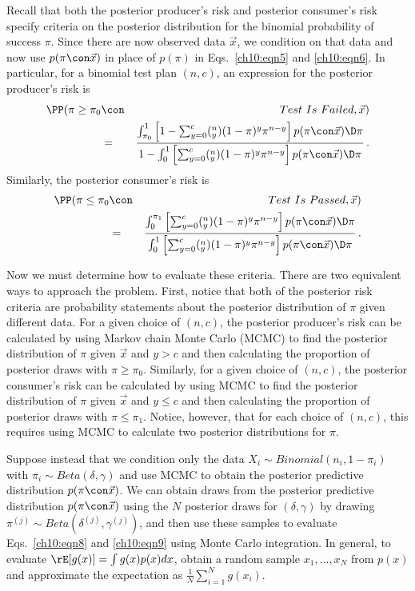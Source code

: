 \documentclass {book}
\begin{document}
Recall that both the posterior producer's
risk and posterior
consumer's risk specify
criteria on the posterior distribution for the binomial
probability of success $\pi$. Since there are now observed data
$\vec{x}$, we condition on that data and now use $p(\pi \con
\vec{x})$ in place of $p(\pi)$ in Eqs.~\ref{ch10:eqn5} and
\ref{ch10:eqn6}. In particular, for a binomial test plan $(n,c)$,
an expression for the posterior producer's risk is
\begin{eqnarray}\label{ch10:eqn8}
\PP(\pi \geq \pi_{0} & \con & Test\mbox{ }Is\mbox{ }Failed,\vec{x})\\
& =& \frac{\int_{\pi_0}^{1} \left[
1-\sum^{c}_{y=0}(_y^{n})(1-\pi)^{y}\pi^{n-y} \right] p(\pi \con
\vec{x}) \D \pi}{1-\int_{0}^{1}
\left[\sum^{c}_{y=0}(_y^{n})(1-\pi)^{y}\pi^{n-y} \right] p(\pi
\con \vec{x}) \D \pi}\, .\nonumber
\end{eqnarray}
Similarly, the posterior consumer's risk is
\begin{eqnarray}\label{ch10:eqn9}
\PP(\pi \leq \pi_{0} & \con & Test\mbox{ }Is\mbox{ }Passed,\vec{x})\\
& =& \frac{\int_{0}^{\pi_1} \left[
\sum^{c}_{y=0}(_y^{n})(1-\pi)^{y}\pi^{n-y} \right] p(\pi \con
\vec{x}) \D \pi}{\int_{0}^{1}
\left[\sum^{c}_{y=0}(_y^{n})(1-\pi)^{y}\pi^{n-y} \right] p(\pi
\con \vec{x}) \D \pi} \, .\nonumber
\end{eqnarray}

Now we must determine how to evaluate these criteria. There are
two equivalent ways to approach the problem. First, notice that
both of the posterior risk criteria are probability statements
about the posterior distribution of $\pi$ given different data.
For a given choice of $(n,c)$, the posterior producer's risk can
be calculated by using Markov chain Monte Carlo (MCMC) to find the
posterior distribution of $\pi$ given $\vec{x}$ and $y > c$ and
then calculating the proportion of posterior draws with $\pi \geq
\pi_0$. Similarly, for a given choice of $(n,c)$, the posterior
consumer's risk can be calculated by using MCMC to find the
posterior distribution of $\pi$ given $\vec{x}$ and $y \leq c$ and
then calculating the proportion of posterior draws with $\pi \leq
\pi_1$. Notice, however, that for each choice of $(n,c)$, this
requires using MCMC to calculate two posterior distributions for
$\pi$.

Suppose instead that we condition only the data $X_i \sim
Binomial(n_i, 1-\pi_i)$ with $\pi_i \sim Beta(\delta,\gamma)$ and
use MCMC to obtain the posterior predictive distribution $p(\pi
\con \vec{x})$. We can obtain draws from the posterior predictive
distribution $p(\pi \con \vec{x})$ using the $N$ posterior draws
for $(\delta, \gamma)$ by drawing $\pi^{(j)} \sim
Beta(\delta^{(j)}, \gamma^{(j)})$, and then use these samples to
evaluate Eqs.~\ref{ch10:eqn8} and \ref{ch10:eqn9} using Monte
Carlo integration. In general, to evaluate $\rE[g(x)] = \int g(x)
p(x) dx$, obtain a random sample $x_1, \ldots, x_N$ from $p(x)$
and approximate the expectation as $\frac{1}{N} \sum_{i=1}^{N}
g(x_i)$.
\end{document}
